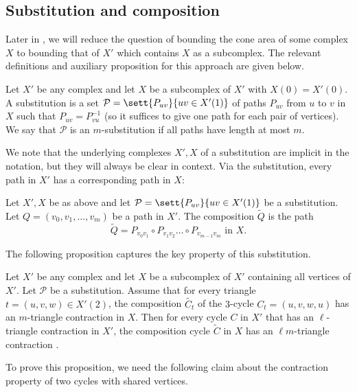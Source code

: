 \subsection{Substitution and composition}

Later in , we will reduce the question of bounding the cone area of some complex $X$ to bounding that of $X'$ which contains $X$ as a subcomplex. The relevant definitions and auxiliary proposition for this approach are given below.

\begin{definition}
    Let \(X'\) be any complex and let \(X\) be a subcomplex of \(X'\) with $X(0) = X'(0)$. A substitution is a set \(\mathcal{P} = \sett{P_{uv}}{uv \in X'(1)}\) of paths \(P_{uv}\) from $u$ to $v$ in \(X\) such that $P_{uv} = P^{-1}_{vu}$ (so it suffices to give one path for each pair of vertices). We say that \(\mathcal{P}\) is an \(m\)-substitution if all paths have length at most \(m\).
\end{definition}
We note that the underlying complexes $X',X$ of a substitution are implicit in the notation, but they will always be clear in context. Via the substitution, every path in $X'$ has a corresponding path in $X$:
\begin{definition}
    Let \(X',X\) be as above and let \(\mathcal{P} = \sett{P_{uv}}{uv \in X'(1)}\) be a substitution. Let \(Q=(v_0,v_1,\dots,v_m)\) be a path in \(X'\). The composition \(\tilde{Q}\) is the path
    \[\tilde{Q} = P_{v_0v_1} \circ P_{v_1 v_2} \dots \circ P_{v_{m-1}v_m} \text{ in }X.\]
\end{definition}

The following proposition captures the key property of this substitution.
\begin{proposition} \label{prop:cone-composition}
    Let \(X'\) be any complex and let \(X\) be a subcomplex of \(X'\) containing all vertices of $X'$. Let \(\mathcal{P}\) be a substitution. Assume that for every triangle \(t=(u,v,w) \in X'(2)\), the composition \(\tilde{C_t}\) of the \(3\)-cycle \(C_t=(u,v,w,u)\) has an \(m\)-triangle contraction in \(X\). Then for every cycle \(C\) in \(X'\) that has an \(\ell\)-triangle contraction in \(X'\), the composition cycle \(\tilde{C}\) in \(X\) has an \(\ell m\)-triangle contraction .
\end{proposition}

To prove this proposition, we need the following claim about the contraction property of two cycles with shared vertices.

